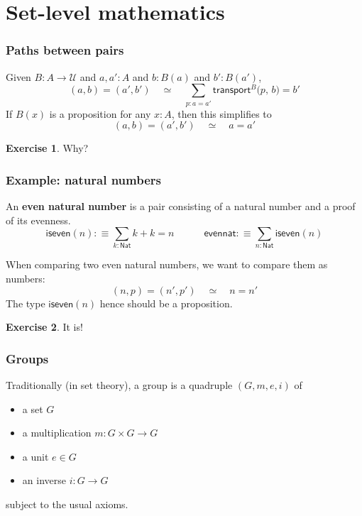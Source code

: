 \documentclass{beamer}
\newcommand{\fat}[1]{\textbf{#1}}
\newcommand{\constfont}[1]{\ensuremath{\mathsf{#1}}}
\newcommand{\U}{\mathcal{U}}
\newcommand{\Nat}{\constfont{Nat}}
\newcommand{\Transfib}[3]{\ensuremath{\mathsf{transport}^{#1}\Big(#2,\, #3\Big)\xspace}}
\theoremstyle{definition}
\newtheorem{exercise}{Exercise}
\begin{document}
\section{Set-level mathematics}

\begin{frame}
 \frametitle{Paths between pairs}

  Given $B : A \to \U$ and $a,a' : A$ and $b : B(a)$ and $b' : B(a')$,
    \[ (a,b) = (a',b') \quad \simeq \quad \sum_{p : a = a'} \Transfib{B}{p}{b} = b' \]
  If $B(x)$ is a proposition for any $x:A$, then this simplifies to
  \[ (a,b) = (a',b') \quad \simeq \quad a = a' \]\pause

  \begin{exercise}
    Why?
  \end{exercise}
\end{frame}

\begin{frame}
 \frametitle{Example: natural numbers}

  An \fat{even natural number} is a pair consisting of a natural number and a proof of its evenness.
  \[
    \constfont{iseven}(n):\equiv\sum_{k:\Nat}k+k=n\quad\quad\quad
    \constfont{evennat}:\equiv\sum_{n:\Nat}\constfont{iseven}(n)
  \]\pause

  When comparing two even natural numbers, we want to compare them as numbers:
  \[  (n, p) = (n',p') \quad \simeq \quad n = n' \]\pause
  The type $\constfont{iseven}(n)$ hence should be a proposition.\pause
  \begin{exercise}
    It is!
  \end{exercise}

\end{frame}

\begin{frame}
 \frametitle{Groups}

    Traditionally (in set theory), a group is a quadruple $(G,m, e, i)$ of
      \begin{itemize}
       \item a set $G$
       \item a multiplication $m : G\times G \to G$
       \item a unit $e \in G$
       \item an inverse $i : G \to G$
      \end{itemize}
     subject to the usual axioms.

\end{frame}
\end{document}
